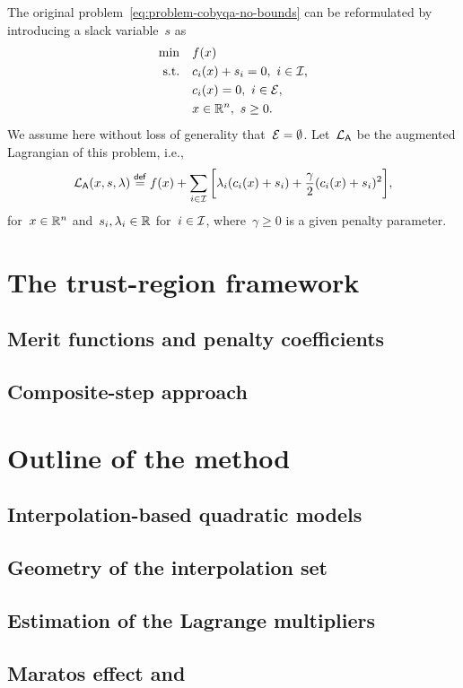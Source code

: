 The original problem~\cref{eq:problem-cobyqa-no-bounds} can be reformulated by introducing a slack variable~$s$ as
\begin{align}
    \min        & \quad f(x)\\
    \text{s.t.} & \quad c_{i}(x) + s_i = 0, ~ i \in \mathcal{I},\\
                & \quad c_{i}(x) = 0, ~ i \in \mathcal{E},\\
                & \quad x \in \mathbb{R}^n, ~ s \ge 0.
\end{align}
We assume here without loss of generality that~$\mathcal{E} = \emptyset$.
Let~$\lag[\mathsf{A}]$ be the augmented Lagrangian of this problem, i.e.,
\begin{equation*}
    \lag[\mathsf{A}](x, s, \lambda) \eqdef \obj(x) + \sum_{i \in \iub} \bigg[ \lambda_i (\con{i}(x) + s_i) + \frac{\gamma}{2} (\con{i}(x) + s_i)^2 \bigg],
\end{equation*}
for~$x \in \mathbb{R}^n$ and~$s_i, \lambda_i \in \mathbb{R}$ for~$i \in \mathcal{I}$, where~$\gamma \ge 0$ is a given penalty parameter.

\section{The trust-region framework}

\subsection{Merit functions and penalty coefficients}

\subsection{Composite-step approach}

\section{Outline of the  method}

\subsection{Interpolation-based quadratic models}

\subsection{Geometry of the interpolation set}

\subsection{Estimation of the Lagrange multipliers}

\subsection{Maratos effect and }
